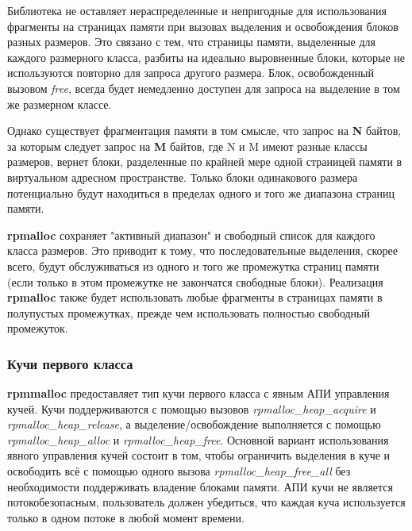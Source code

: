 Библиотека не оставляет нераспределенные и непригодные для использования фрагменты на страницах памяти при вызовах выделения и освобождения блоков разных размеров. Это связано с тем, что страницы памяти, выделенные для каждого размерного класса, разбиты на идеально выровненные блоки, которые не используются повторно для запроса другого размера. Блок, освобожденный вызовом \textit{free}, всегда будет немедленно доступен для запроса на выделение в том же размерном классе.

Однако существует фрагментация памяти в том смысле, что запрос на \textbf{N} байтов, за которым следует запрос на \textbf{M} байтов, где N и M имеют разные классы размеров, вернет блоки, разделенные по крайней мере одной страницей памяти в виртуальном адресном пространстве. Только блоки одинакового размера потенциально будут находиться в пределах одного и того же диапазона страниц памяти.

\textbf{rpmalloc} сохраняет "активный диапазон" и свободный список для каждого класса размеров. Это приводит к тому, что последовательные выделения, скорее всего, будут обслуживаться из одного и того же промежутка страниц памяти (если только в этом промежутке не закончатся свободные блоки). Реализация \textbf{rpmalloc} также будет использовать любые фрагменты в страницах памяти в полупустых промежутках, прежде чем использовать полностью свободный промежуток.

\subsubsection{Кучи первого класса}

\textbf{rpmmalloc} предоставляет тип кучи первого класса с явным АПИ управления кучей. Кучи поддерживаются с помощью вызовов \textit{rpmalloc\_heap\_acquire} и \textit{rpmalloc\_heap\_release}, а выделение/освобождение выполняется с помощью \textit{rpmalloc\_heap\_alloc} и \textit{rpmalloc\_heap\_free}. Основной вариант использования явного управления кучей состоит в том, чтобы ограничить выделения в куче и освободить всё с помощью одного вызова \textit{rpmalloc\_heap\_free\_all} без необходимости поддерживать владение блоками памяти. АПИ кучи не является потокобезопасным, пользователь должен убедиться, что каждая куча используется только в одном потоке в любой момент времени.